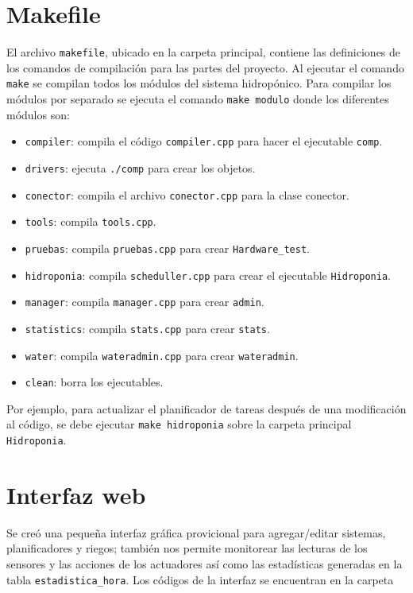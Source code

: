 \documentclass[10pt,twocolumn]{article}
\begin{document}
\section{Makefile}
El archivo \verb|makefile|, ubicado en la carpeta principal, contiene las definiciones de los comandos de compilaci\'on para las partes del proyecto. Al ejecutar el comando 
\verb|make| se compilan todos los m\'odulos del sistema hidrop\'onico. Para compilar los m\'odulos por separado se ejecuta el comando \verb|make modulo| donde los 
diferentes m\'odulos son:
\begin{itemize}
\item \verb|compiler|: compila el c\'odigo \verb|compiler.cpp| para hacer el ejecutable \verb|comp|.
\item \verb|drivers|: ejecuta \verb|./comp| para crear los objetos.
\item \verb|conector|: compila el archivo \verb|conector.cpp| para la clase conector.
\item \verb|tools|: compila \verb|tools.cpp|.
\item \verb|pruebas|: compila \verb|pruebas.cpp| para crear \verb|Hardware_test|.
\item \verb|hidroponia|: compila \verb|scheduller.cpp| para crear el ejecutable \verb|Hidroponia|.
\item \verb|manager|: compila \verb|manager.cpp| para crear \verb|admin|.
\item \verb|statistics|: compila \verb|stats.cpp| para crear \verb|stats|.
\item \verb|water|: compila \verb|wateradmin.cpp| para crear \verb|wateradmin|.
\item \verb|clean|: borra los ejecutables.
\end{itemize}

Por ejemplo, para actualizar el planificador de tareas despu\'es de una modificaci\'on al c\'odigo, se debe ejecutar \verb|make hidroponia| sobre la carpeta principal 
\verb|Hidroponia|.

\section{Interfaz web}
Se cre\'o una peque\~na interfaz gr\'afica provicional para agregar/editar sistemas, planificadores y riegos; tambi\'en 
nos permite monitorear las lecturas de los sensores y las acciones de 
los actuadores as\'i como las estad\'isticas generadas en la tabla \verb|estadistica_hora|. 
Los c\'odigos de la interfaz se encuentran en la carpeta
\end{document}
